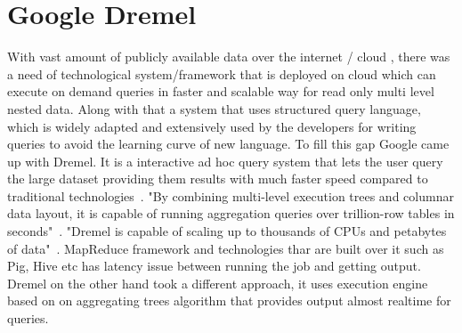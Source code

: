 \section{Google Dremel}


With vast amount of publicly available data over the internet / cloud , 
there was a need of technological system/framework that is deployed on 
cloud which can execute on demand queries in faster and scalable way 
for read only multi level nested data. Along with that a system that 
uses structured query language, which is widely adapted and extensively 
used by the developers for writing queries to avoid the learning curve of 
new language. To fill this gap Google came up with Dremel. It is a 
interactive ad hoc query system that lets the user query the large 
dataset providing them results with much faster speed compared to 
traditional technologies~\cite{hid-sp18-523-www-dremel}. "By combining 
multi-level execution trees and columnar data layout, it is capable of 
running aggregation queries over trillion-row tables in 
seconds"~\cite{hid-sp18-523-www-dremel}. "Dremel is capable of scaling 
up to thousands of CPUs and petabytes of data"~\cite{hid-sp18-523-www-dremel}.
MapReduce framework and technologies thar are built over it such as Pig, Hive 
etc has latency issue between running the job and getting output. 
Dremel on the other hand took a different approach, it uses execution engine
based on on aggregating trees algorithm that provides output almost realtime 
for queries.
